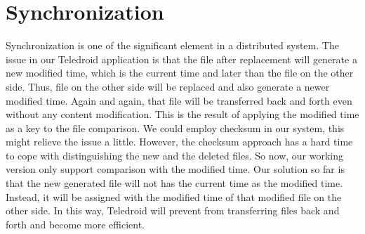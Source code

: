 \section{Synchronization}
\label{sec:Synchronization}
Synchronization is one of the significant element in a distributed system. The issue in our Teledroid application is that the file after replacement will generate a new modified time, which is the current time and later than the file on the other side. Thus, file on the other side will be replaced and also generate a newer modified time. Again and again, that file will be transferred back and forth even without any content modification. This is the result of applying the modified time as a key to the file comparison. We could employ checksum in our system, this might relieve the issue a little. However, the checksum approach has a hard time to cope with distinguishing the new and the deleted files. So now, our working version only support comparison with the modified time. Our solution so far is that the new generated file will not has the current time as the modified time. Instead, it will be assigned with the modified time of that modified file on the other side. In this way, Teledroid will prevent from transferring files back and forth and become more efficient.

